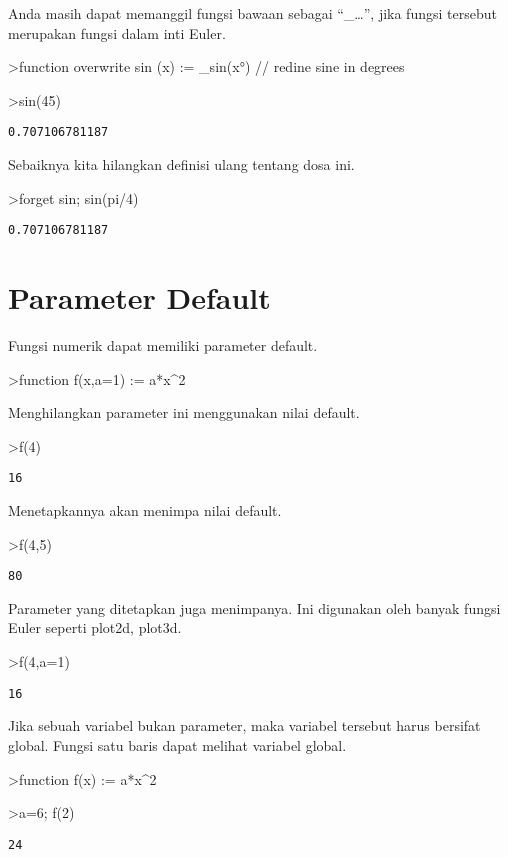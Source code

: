 \documentclass[
]{book}
\begin{document}
Anda masih dapat memanggil fungsi bawaan sebagai ``\_\ldots'', jika fungsi tersebut merupakan fungsi dalam inti Euler.

\textgreater function overwrite sin (x) := \_sin(x°) // redine sine in degrees

\textgreater sin(45)

\begin{verbatim}
0.707106781187
\end{verbatim}

Sebaiknya kita hilangkan definisi ulang tentang dosa ini.

\textgreater forget sin; sin(pi/4)

\begin{verbatim}
0.707106781187
\end{verbatim}

\section{Parameter Default}\label{parameter-default}

Fungsi numerik dapat memiliki parameter default.

\textgreater function f(x,a=1) := a*x\^{}2

Menghilangkan parameter ini menggunakan nilai default.

\textgreater f(4)

\begin{verbatim}
16
\end{verbatim}

Menetapkannya akan menimpa nilai default.

\textgreater f(4,5)

\begin{verbatim}
80
\end{verbatim}

Parameter yang ditetapkan juga menimpanya. Ini digunakan oleh banyak fungsi Euler seperti plot2d, plot3d.

\textgreater f(4,a=1)

\begin{verbatim}
16
\end{verbatim}

Jika sebuah variabel bukan parameter, maka variabel tersebut harus bersifat global. Fungsi satu baris dapat melihat variabel global.

\textgreater function f(x) := a*x\^{}2

\textgreater a=6; f(2)

\begin{verbatim}
24
\end{verbatim}
\end{document}
